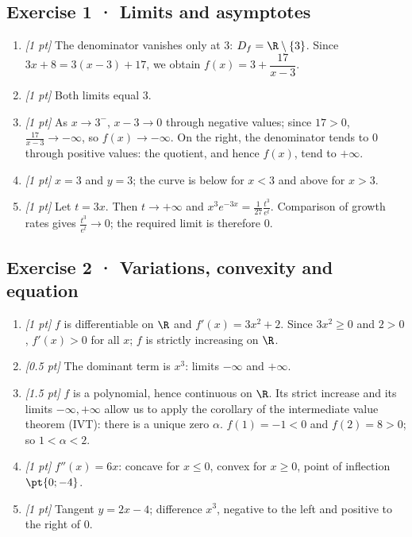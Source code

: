\subsection*{Exercise 1 · Limits and asymptotes}\begin{enumerate}

\item \textit{[1 pt]} The denominator vanishes only at $3$: $D_f=\R\setminus\{3\}$. Since $3x+8=3(x-3)+17$, we obtain $f(x)=3+\dfrac{17}{x-3}$.

\item \textit{[1 pt]} Both limits equal $3$.

\item \textit{[1 pt]} As $x\to 3^-$, $x-3\to0$ through negative values; since $17>0$, $\frac{17}{x-3}\to-\infty$, so $f(x)\to-\infty$. On the right, the denominator tends to $0$ through positive values: the quotient, and hence $f(x)$, tend to $+\infty$.

\item \textit{[1 pt]} $x=3$ and $y=3$; the curve is below for $x<3$ and above for $x>3$.

\item \textit{[1 pt]} Let $t=3x$. Then $t\to+\infty$ and $x^3e^{-3x}=\frac{1}{27}\frac{t^3}{e^t}$. Comparison of growth rates gives $\frac{t^3}{e^t}\to0$; the required limit is therefore $0$.

\end{enumerate}

\subsection*{Exercise 2 · Variations, convexity and equation}\begin{enumerate}

\item \textit{[1 pt]} $f$ is differentiable on $\R$ and $f'(x)=3x^2+2$. Since $3x^2\ge0$ and $2>0$, $f'(x)>0$ for all $x$; $f$ is strictly increasing on $\R$.

\item \textit{[0.5 pt]} The dominant term is $x^3$: limits $-\infty$ and $+\infty$.

\item \textit{[1.5 pt]} $f$ is a polynomial, hence continuous on $\R$. Its strict increase and its limits $-\infty,+\infty$ allow us to apply the corollary of the intermediate value theorem (IVT): there is a unique zero $\alpha$. $f(1)=-1<0$ and $f(2)=8>0$; so $1<\alpha<2$.

\item \textit{[1 pt]} $f''(x)=6x$: concave for $x\le0$, convex for $x\ge0$, point of inflection $\pt{0;-4}$.

\item \textit{[1 pt]} Tangent $y=2x-4$; difference $x^3$, negative to the left and positive to the right of $0$.

\end{enumerate}

